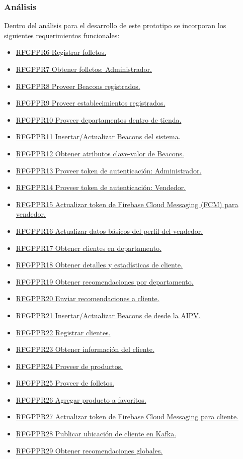 \subsubsection{Análisis}
Dentro del análisis para el desarrollo de este prototipo se incorporan los siguientes requerimientos funcionales:
\begin{itemize}
\item \hyperlink{RFSGPyPDR}{RFGPPR6 Registrar folletos.}
\item \hyperlink{RFSGPyPDR}{RFGPPR7 Obtener folletos: Administrador.}
\item \hyperlink{RFSGPyPDR}{RFGPPR8 Proveer Beacons registrados.}
\item \hyperlink{RFSGPyPDR}{RFGPPR9 Proveer establecimientos registrados.}
\item \hyperlink{RFSGPyPDR}{RFGPPR10 Proveer departamentos dentro de tienda.}
\item \hyperlink{RFSGPyPDR}{RFGPPR11 Insertar/Actualizar Beacons del sistema.}
\item \hyperlink{RFSGPyPDR}{RFGPPR12 Obtener atributos clave-valor de Beacons.}
\item \hyperlink{RFSGPyPDR}{RFGPPR13 Proveer token de autenticación: Administrador.}
\item \hyperlink{RFSGPyPDR}{RFGPPR14 Proveer token de autenticación: Vendedor.}
\item \hyperlink{RFSGPyPDR}{RFGPPR15 Actualizar token de Firebase Cloud Messaging (FCM) para vendedor.}
\item \hyperlink{RFSGPyPDR}{RFGPPR16 Actualizar datos básicos del perfil del vendedor.}
\item \hyperlink{RFSGPyPDR}{RFGPPR17 Obtener clientes en departamento.}
\item \hyperlink{RFSGPyPDR}{RFGPPR18 Obtener detalles y estadísticas de cliente.}
\item \hyperlink{RFSGPyPDR}{RFGPPR19 Obtener recomendaciones por departamento.}
\item \hyperlink{RFSGPyPDR}{RFGPPR20 Enviar recomendaciones a cliente.}
\item \hyperlink{RFSGPyPDR}{RFGPPR21 Insertar/Actualizar Beacons de desde la AIPV.}
\item \hyperlink{RFSGPyPDR}{RFGPPR22 Registrar clientes.}
\item \hyperlink{RFSGPyPDR}{RFGPPR23 Obtener información del cliente.}
\item \hyperlink{RFSGPyPDR}{RFGPPR24 Proveer de productos.}
\item \hyperlink{RFSGPyPDR}{RFGPPR25 Proveer de folletos.}
\item \hyperlink{RFSGPyPDR}{RFGPPR26 Agregar producto a favoritos.}
\item \hyperlink{RFSGPyPDR}{RFGPPR27 Actualizar token de Firebase Cloud Messaging para cliente.}
\item \hyperlink{RFSGPyPDR}{RFGPPR28 Publicar ubicación de cliente en Kafka.}
\item \hyperlink{RFSGPyPDR}{RFGPPR29 Obtener recomendaciones globales.}
\end{itemize}
